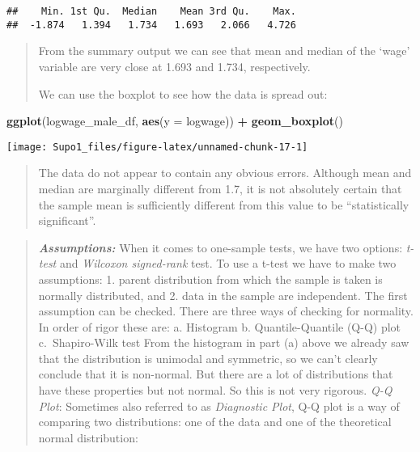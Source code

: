 \documentclass[
]{article}
\newenvironment{Shaded}{\begin{snugshade}}{\end{snugshade}}
\newcommand{\AttributeTok}[1]{\textcolor[rgb]{0.13,0.29,0.53}{#1}}
\newcommand{\FunctionTok}[1]{\textcolor[rgb]{0.13,0.29,0.53}{\textbf{#1}}}
\newcommand{\NormalTok}[1]{#1}
\newcommand{\SpecialCharTok}[1]{\textcolor[rgb]{0.81,0.36,0.00}{\textbf{#1}}}
\begin{document}
\begin{Shaded}
\end{Shaded}

\begin{verbatim}
##    Min. 1st Qu.  Median    Mean 3rd Qu.    Max. 
##  -1.874   1.394   1.734   1.693   2.066   4.726
\end{verbatim}

\begin{quote}
From the summary output we can see that mean and median of the `wage'
variable are very close at 1.693 and 1.734, respectively.

We can use the boxplot to see how the data is spread out:
\end{quote}

\begin{Shaded}
\begin{Highlighting}[]
\FunctionTok{ggplot}\NormalTok{(logwage\_male\_df,}
       \FunctionTok{aes}\NormalTok{(}\AttributeTok{y =}\NormalTok{ logwage)) }\SpecialCharTok{+}
  \FunctionTok{geom\_boxplot}\NormalTok{()}
\end{Highlighting}
\end{Shaded}

\begin{center}\texttt{[image: Supo1\_files/figure-latex/unnamed-chunk-17-1]} \end{center}

\begin{quote}
The data do not appear to contain any obvious errors. Although mean and
median are marginally different from 1.7, it is not absolutely certain
that the sample mean is sufficiently different from this value to be
``statistically significant''.
\end{quote}

\begin{quote}
\textbf{\emph{Assumptions:}} When it comes to one-sample tests, we have
two options: \emph{t-test} and \emph{Wilcoxon signed-rank} test. To use
a t-test we have to make two assumptions: 1. parent distribution from
which the sample is taken is normally distributed, and 2. data in the
sample are independent. The first assumption can be checked. There are
three ways of checking for normality. In order of rigor these are: a.
Histogram b. Quantile-Quantile (Q-Q) plot c.~Shapiro-Wilk test From the
histogram in part (a) above we already saw that the distribution is
unimodal and symmetric, so we can't clearly conclude that it is
non-normal. But there are a lot of distributions that have these
properties but not normal. So this is not very rigorous. \emph{Q-Q
Plot}: Sometimes also referred to as \emph{Diagnostic Plot}, Q-Q plot is
a way of comparing two distributions: one of the data and one of the
theoretical normal distribution:
\end{quote}
\end{document}

